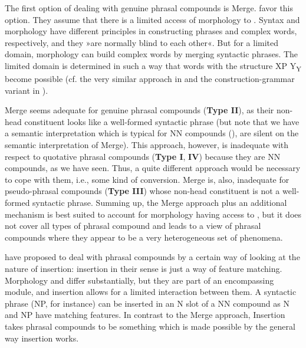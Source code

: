 \documentclass[output=paper]{LSP/langsci}
\begin{document}
The first option of dealing with genuine phrasal compounds is Merge. \citet{LS06} favor this option. They assume that there is a limited access of morphology to . Syntax and morphology have different principles in constructing phrases and complex words, respectively, and they »are normally blind to each other«. But for a limited domain, morphology can build complex words by merging syntactic phrases. The limited domain is determined in such a way that words with the structure {\ob}{\ob}XP{\cb} Y{\cb}\textsubscript{Y} become possible (cf. the very similar approach in \citet[§II.5]{Lawrenz2006} and the construction-grammar variant in \citet[42, 115]{Hein2015}). 
 
Merge seems adequate for genuine phrasal compounds (\textbf{Type II}), as their non-head constituent looks like a well-formed syntactic phrase (but note that we have a semantic interpretation which is typical for NN compounds (\citealt[141]{Lawrenz2006}), \citet{LS06} are silent on the semantic interpretation of Merge). This approach, however, is inadequate with respect to quotative phrasal compounds (\textbf{Type I}, \textbf{IV}) because they are NN compounds, as we have seen. Thus, a quite different approach would be necessary to cope with them, i.e., some kind of conversion. Merge is, also, inadequate for pseudo-phrasal compounds (\textbf{Type III}) whose non-head constituent is not a well-formed syntactic phrase. Summing up, the Merge approach plus an additional mechanism is best suited to account for morphology having access to , but it does not cover all types of phrasal compound and leads to a view of phrasal compounds where they appear to be a very heterogeneous set of phenomena.
 
\citet{AN04} have proposed to deal with phrasal compounds by a certain way of looking at the nature of insertion: insertion in their sense is just a way of feature matching. Morphology and  differ substantially, but they are part of an encompassing module, and insertion allows for a limited interaction between them. A syntactic phrase (NP, for instance) can be inserted in an N slot of a NN compound as N and NP have matching features. In contrast to the Merge approach, Insertion takes phrasal compounds to be something which is made possible by the general way insertion works. 
 
\end{document}
